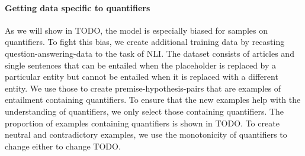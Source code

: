 \paragraph{Getting data specific to quantifiers}

As we will show in TODO, the model is especially biased for samples on quantifiers. To fight this bias, we create additional training data by recasting question-answering-data to the task of \ac{NLI}. The dataset consists of articles and single sentences that can be entailed when the placeholder is replaced by a particular entity but cannot be entailed when it is replaced with a different entity. We use those to create premise-hypothesis-pairs that are examples of entailment containing quantifiers. To ensure that the new examples help with the understanding of quantifiers, we only select those containing quantifiers. The proportion of examples containing quantifiers is shown in TODO. To create neutral and contradictory examples, we use the monotonicity of quantifiers to change either to change TODO.